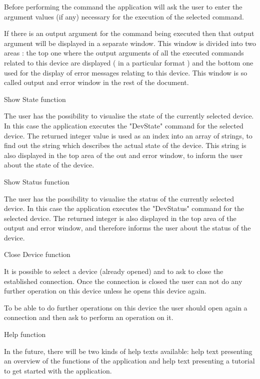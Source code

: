 Before performing the command the application will ask the user to enter the
argument values (if any) necessary for the execution of the selected command.

If there is an output argument for the command being executed then that output
argument will be displayed in a separate window. This window is divided into
two areas : the top one where the output arguments of all the executed 
commands related to this device are displayed ( in a particular format ) and the
bottom one used for the display of error messages relating to this device. 
This window is so called output and error window in the rest of the document. 

	{Show State function}

The user has the possibility to visualise the state of the currently selected
device. In this case the application executes the "DevState" command for the
selected device. The returned integer value is used as an index into an array of
strings, to find out the string which describes the actual state of the device.
This string is also displayed in the top area of the out and error window, to
inform the user about the state of the device.


  {Show Status function}

The user has the possibility to visualise the status of the currently selected
device. In this case the application executes the "DevStatus" command for the
selected device. The returned integer is also displayed in the top area of the  
output and error window, and therefore informs the user about the status of the 
device.


	{Close Device function}

It is possible to select a device (already opened) and to ask to close the
established connection. Once the connection is closed the user can not
do any further operation on this device unless he opens this device again.

To be able to do further operations on this device the user should open again
a connection and then ask to perform an operation on it.


	{Help function}

In the future, there will be two kinds of help texts available: 
help text presenting an overview of the functions of the application and 
help text presenting a tutorial to get started with the application.

